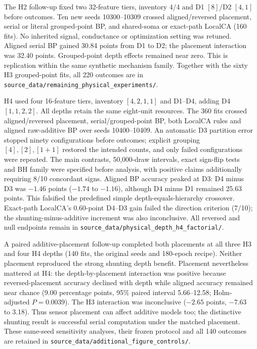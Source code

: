 The H2 follow-up fixed two 32-feature tiers, inventory 4/4 and D1 $[8]$/D2 $[4,1]$ before outcomes. Ten new seeds 10300--10309 crossed aligned/reversed placement, serial or literal grouped-point BP, and shared-soma or exact-path LocalCA (160 fits). No inherited signal, conductance or optimization setting was retuned. Aligned serial BP gained 30.84 points from D1 to D2; the placement interaction was 32.40 points. Grouped-point depth effects remained near zero. This is replication within the same synthetic mechanism family. Together with the sixty H3 grouped-point fits, all 220 outcomes are in \texttt{source\_data/\allowbreak remaining\_\allowbreak physical\_\allowbreak experiments/}.

H4 used four 16-feature tiers, inventory $[4,2,1,1]$ and D1--D4, adding D4 $[1,1,2,2]$. All depths retain the same eight-unit resources. The 360 fits crossed aligned/reversed placement, serial/grouped-point BP, both LocalCA rules and aligned raw-additive BP over seeds 10400--10409. An automatic D3 partition error stopped ninety configurations before outcomes; explicit grouping $[4],[2],[1+1]$ restored the intended counts, and only failed configurations were repeated. The main contrasts, 50,000-draw intervals, exact sign-flip tests and BH family were specified before analysis, with positive claims additionally requiring 8/10 concordant signs. Aligned BP accuracy peaked at D3: D4 minus D3 was $-1.46$ points ($-1.74$ to $-1.16$), although D4 minus D1 remained 25.63 points. This falsified the predefined simple depth-equals-hierarchy crossover. Exact-path LocalCA's 0.60-point D4--D3 gain failed the direction criterion (7/10); the shunting-minus-additive increment was also inconclusive. All reversed and null endpoints remain in \texttt{source\_data/physical\_depth\_h4\_factorial/}.

A paired additive-placement follow-up completed both placements at all three H3 and four H4 depths (140 fits, the original seeds and 180-epoch recipe). Neither placement reproduced the strong shunting depth benefit. Placement nevertheless mattered at H4: the depth-by-placement interaction was positive because reversed-placement accuracy declined with depth while aligned accuracy remained near chance (9.00 percentage points, 95\% paired interval 5.66--12.58; Holm-adjusted $P=0.0039$). The H3 interaction was inconclusive ($-2.65$ points, $-7.63$ to 3.18). Thus sensor placement can affect additive models too; the distinctive shunting result is successful serial computation under the matched placement. These same-seed sensitivity analyses, their frozen protocol and all 140 outcomes are retained in \texttt{source\_data/additional\_figure\_controls/}.

